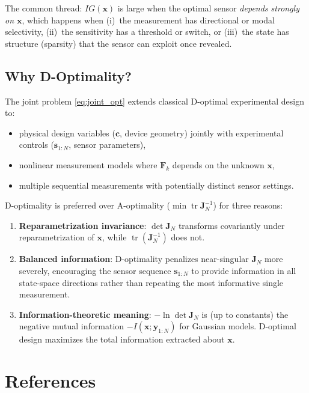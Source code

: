\documentclass[11pt,a4paper]{article}
\newcommand{\tr}{\operatorname{tr}}
\begin{document}
The common thread: $IG(\bm{x})$ is large when the optimal sensor \emph{depends strongly on $\bm{x}$}, which happens when (i)~the measurement has directional or modal selectivity, (ii)~the sensitivity has a threshold or switch, or (iii)~the state has structure (sparsity) that the sensor can exploit once revealed.

\subsection{Why D-Optimality?}

The joint problem \eqref{eq:joint_opt} extends classical D-optimal experimental design to:
\begin{itemize}[nosep]
  \item physical design variables ($\bm{c}$, device geometry) jointly with experimental controls ($\bm{s}_{1:N}$, sensor parameters),
  \item nonlinear measurement models where $\bm{F}_k$ depends on the unknown $\bm{x}$,
  \item multiple sequential measurements with potentially distinct sensor settings.
\end{itemize}

D-optimality is preferred over A-optimality ($\min\tr\bm{J}_N^{-1}$) for three reasons:
\begin{enumerate}[nosep]
  \item \textbf{Reparametrization invariance}: $\det\bm{J}_N$ transforms covariantly under reparametrization of $\bm{x}$, while $\tr(\bm{J}_N^{-1})$ does not.
  \item \textbf{Balanced information}: D-optimality penalizes near-singular $\bm{J}_N$ more severely, encouraging the sensor sequence $\bm{s}_{1:N}$ to provide information in all state-space directions rather than repeating the most informative single measurement.
  \item \textbf{Information-theoretic meaning}: $-\ln\det\bm{J}_N$ is (up to constants) the negative mutual information $-I(\bm{x}; \bm{y}_{1:N})$ for Gaussian models.  D-optimal design maximizes the total information extracted about $\bm{x}$.
\end{enumerate}

\section*{References}
\end{document}
